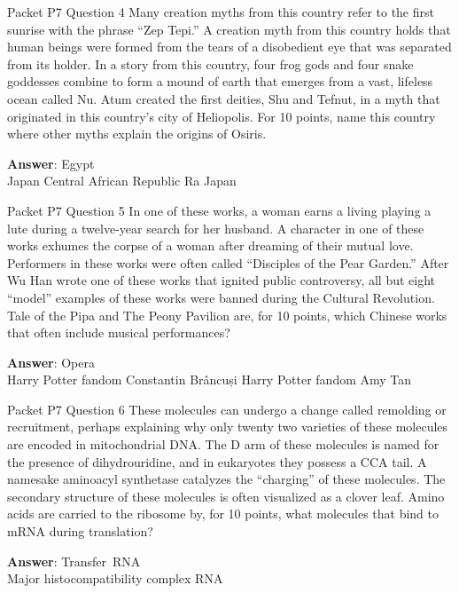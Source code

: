 \begin{frame}{Packet P7 Question 4}
Many creation myths from this country refer to the first sunrise with the phrase “Zep Tepi.” A creation myth from this country holds that human beings were formed from the tears of a disobedient eye that was separated from its holder. In a story from this country, four frog gods and   four snake goddesses combine to form a mound of earth that emerges from a vast, lifeless ocean called Nu. Atum created the first deities, Shu and Tefnut, in a myth that originated in this country’s city of Heliopolis. For 10 points, name this country where other myths explain the origins of Osiris.      

\textbf{Answer}: Egypt\\
 Japan
 Central African Republic
 Ra
 Japan
\end{frame}

\begin{frame}{Packet P7 Question 5}
In one of these works, a woman earns a living playing a lute during a twelve-year search for her husband. A character in one of these works exhumes the corpse of a woman after dreaming of their mutual love. Performers in these works were often called “Disciples of the Pear Garden.” After Wu Han wrote one of these works that ignited public controversy, all but eight “model” examples of these works were banned during the Cultural Revolution. Tale of the Pipa and The Peony Pavilion   are, for 10 points, which Chinese works that often include musical performances?      

\textbf{Answer}: Opera\\
 Harry Potter fandom
 Constantin Brâncuși
 Harry Potter fandom
 Amy Tan
\end{frame}

\begin{frame}{Packet P7 Question 6}
These molecules can undergo   a change called remolding or recruitment,   perhaps explaining why only twenty two varieties of these molecules are encoded in mitochondrial DNA. The D arm of these molecules is named for the presence of dihydrouridine, and in eukaryotes   they possess a CCA tail. A namesake aminoacyl synthetase catalyzes   the “charging” of these molecules. The secondary structure of these molecules is often visualized as a clover leaf. Amino acids are carried to the ribosome by, for 10 points, what molecules that   bind to mRNA during   translation?

\textbf{Answer}: Transfer\ RNA\\
 Major histocompatibility complex
 RNA
\end{frame}

